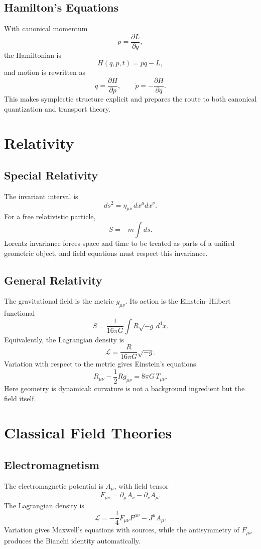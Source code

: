\documentclass[11pt]{article}
\newcommand{\Lag}{\mathcal{L}}
\begin{document}
\subsection{Hamilton's Equations}
With canonical momentum
\[
p=\frac{\partial L}{\partial \dot q},
\]
the Hamiltonian is
\[
H(q,p,t)=p\dot q-L,
\]
and motion is rewritten as
\[
\dot q=\frac{\partial H}{\partial p},
\qquad
\dot p=-\frac{\partial H}{\partial q}.
\]
This makes symplectic structure explicit and prepares the route to both
canonical quantization and transport theory.

\section{Relativity}
\subsection{Special Relativity}
The invariant interval is
\[
ds^2=\eta_{\mu\nu}\,dx^\mu dx^\nu.
\]
For a free relativistic particle,
\[
S=-m\int ds.
\]
Lorentz invariance forces space and time to be treated as parts of a unified
geometric object, and field equations must respect this invariance.

\subsection{General Relativity}
The gravitational field is the metric $g_{\mu\nu}$. Its action is the
Einstein--Hilbert functional
\[
\boxed{
S=\frac{1}{16\pi G}\int R\sqrt{-g}\,d^4x.
}
\]
Equivalently, the Lagrangian density is
\[
\boxed{
\Lag=\frac{R}{16\pi G}\sqrt{-g}.
}
\]
Variation with respect to the metric gives Einstein's equations
\[
R_{\mu\nu}-\frac12 Rg_{\mu\nu}=8\pi G\,T_{\mu\nu}.
\]
Here geometry is dynamical: curvature is not a background ingredient but the
field itself.

\section{Classical Field Theories}
\subsection{Electromagnetism}
The electromagnetic potential is $A_\mu$, with field tensor
\[
F_{\mu\nu}=\partial_\mu A_\nu-\partial_\nu A_\mu.
\]
The Lagrangian density is
\[
\boxed{
\Lag=-\frac14 F_{\mu\nu}F^{\mu\nu}-J^\mu A_\mu.
}
\]
Variation gives Maxwell's equations with sources, while the antisymmetry of
$F_{\mu\nu}$ produces the Bianchi identity automatically.
\end{document}
